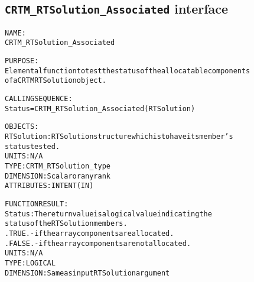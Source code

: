 \subsection{\texttt{CRTM\_RTSolution\_Associated} interface}
  \label{sec:CRTM_RTSolution_Associated_interface}
  \begin{alltt}
 
  NAME:
        CRTM_RTSolution_Associated
 
  PURPOSE:
        Elemental function to test the status of the allocatable components
        of a CRTM RTSolution object.
 
  CALLING SEQUENCE:
        Status = CRTM_RTSolution_Associated( RTSolution )
 
  OBJECTS:
        RTSolution:   RTSolution structure which is to have its member's
                      status tested.
                      UNITS:      N/A
                      TYPE:       CRTM_RTSolution_type
                      DIMENSION:  Scalar or any rank
                      ATTRIBUTES: INTENT(IN)
 
  FUNCTION RESULT:
        Status:       The return value is a logical value indicating the
                      status of the RTSolution members.
                        .TRUE.  - if the array components are allocated.
                        .FALSE. - if the array components are not allocated.
                      UNITS:      N/A
                      TYPE:       LOGICAL
                      DIMENSION:  Same as input RTSolution argument
 
  \end{alltt}
